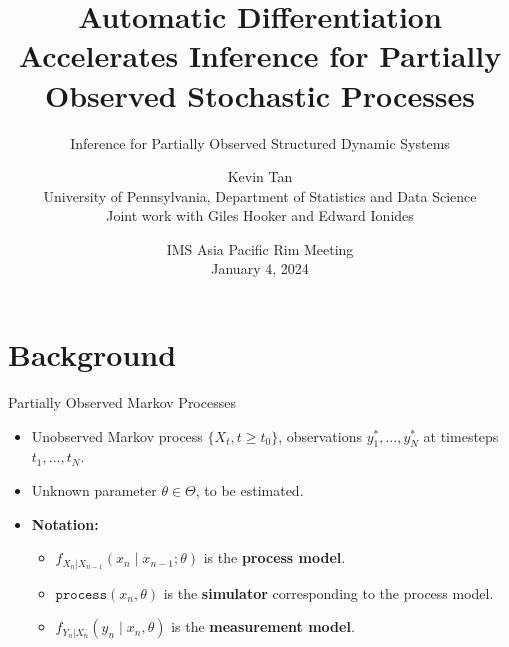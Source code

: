 \documentclass{beamer}
\title[AD for POMPs]{Automatic Differentiation Accelerates Inference for Partially Observed Stochastic Processes}
\subtitle{\small{Inference for Partially Observed Structured Dynamic Systems}}
\author[Kevin Tan]{Kevin Tan \\ \small{University of Pennsylvania, Department of Statistics and Data Science} \\\vspace{0.5cm} \small{Joint work with Giles Hooker and Edward Ionides}}
\date[January 4, 2024]{IMS Asia Pacific Rim Meeting \\ January 4, 2024}
\begin{document}
\maketitle


\section{Background}


\begin{frame}{Partially Observed Markov Processes}

    \begin{itemize}
        \item Unobserved Markov process $\{X_t, t \geq t_0\}$, observations $y_1^*,...,y_N^*$ at timesteps $t_1,..., t_N$.
        \item \pause Unknown parameter $\theta \in \Theta$, to be estimated.
        \item \textbf{Notation:}
        \begin{itemize}
            \item $f_{X_n|X_{n-1}}\left(x_{n} \mid x_{n-1}; \theta\right)$ is the \textbf{process model}.
            \item \pause $\texttt{process}\left(x_n, \theta\right)$ is the \textbf{simulator} corresponding to the process model. 
            \item \pause $f_{Y_n|X_n}\left(y_n \mid x_n, \theta\right)$ is the \textbf{measurement model}.
        \end{itemize}
    \end{itemize}
\end{frame}
\end{document}
